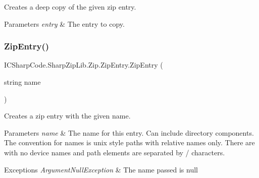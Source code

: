 Creates a deep copy of the given zip entry. 


\begin{DoxyParams}{Parameters}
{\em entry} & The entry to copy. \\
\hline
\end{DoxyParams}
\mbox{\label{class_i_c_sharp_code_1_1_sharp_zip_lib_1_1_zip_1_1_zip_entry_a0964e8db6ee84b427a99c5439c37104a}} 
\subsubsection{\texorpdfstring{Zip\+Entry()}{ZipEntry()}\hspace{0.1cm}{\footnotesize\ttfamily [3/4]}}
{\footnotesize\ttfamily I\+C\+Sharp\+Code.\+Sharp\+Zip\+Lib.\+Zip.\+Zip\+Entry.\+Zip\+Entry (\begin{DoxyParamCaption}\item[{string}]{name }\end{DoxyParamCaption})\hspace{0.3cm}{\ttfamily [inline]}}



Creates a zip entry with the given name. 


\begin{DoxyParams}{Parameters}
{\em name} & The name for this entry. Can include directory components. The convention for names is \textquotesingle{}unix\textquotesingle{} style paths with relative names only. There are with no device names and path elements are separated by \textquotesingle{}/\textquotesingle{} characters. \\
\hline
\end{DoxyParams}

\begin{DoxyExceptions}{Exceptions}
{\em Argument\+Null\+Exception} & The name passed is null \\
\hline
\end{DoxyExceptions}
\mbox{\label{class_i_c_sharp_code_1_1_sharp_zip_lib_1_1_zip_1_1_zip_entry_a6bbb789c245e55161cbfb08d0754b126}} 
